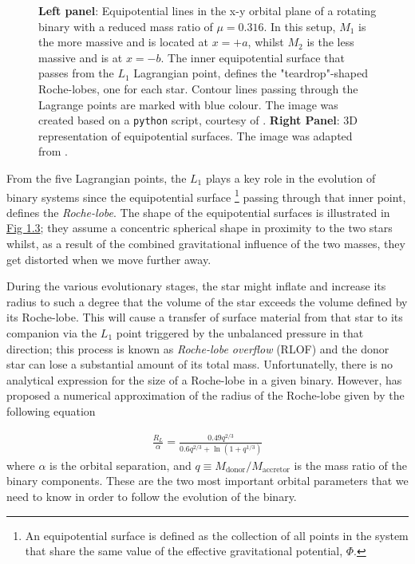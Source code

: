 \documentclass[../../main/thesis_msc.tex]{subfiles}
\begin{document}
\begin{figure}[h]
\begin{subfigure}[h]{0.535\textwidth}
   					 \end{subfigure}
   					 \caption{\textbf{Left panel}: Equipotential lines in the x-y orbital plane of a rotating binary with a reduced mass ratio of $\mu = 0.316$. In this setup, $M_1$ is the more massive and is located at $x = +a$, whilst $M_2$ is the less massive and is at $x = -b$. The inner equipotential surface that passes from the $L_1$ Lagrangian point, defines the "teardrop"-shaped Roche-lobes, one for each star. Contour lines passing through the Lagrange points are marked with blue colour. The image was created based on a \texttt{python} script, courtesy of \cite{Zingale}. \textbf{Right Panel}: 3D representation of equipotential surfaces. The image was adapted from \cite{Sluijs}.}
   					 \label{fig:eq_sur}
				\end{figure}
				
				From the five Lagrangian points, the $L_1$ plays a key role in the evolution of binary systems since the equipotential surface \footnote{An equipotential surface is defined as the collection of all points in the system that share the same value of the effective gravitational potential, $\Phi$.} passing through that inner point, defines the \emph{Roche-lobe}. The shape of the equipotential surfaces is illustrated in \hyperref[fig:eq_sur]{Fig 1.3}; they assume a concentric spherical shape in proximity to the two stars whilst, as a result of the combined gravitational influence of the two masses, they get distorted when we move further away.
				
				During the various evolutionary stages, the star might inflate and increase its radius to such a degree that the volume of the star exceeds the volume defined by its Roche-lobe. This will cause a transfer of surface material from that star to its companion via the $L_1$ point triggered by the unbalanced pressure in that direction; this process is known as \emph{Roche-lobe overflow} (RLOF) and the donor star can lose a substantial amount of its total mass. Unfortunatelly, there is no analytical expression for the size of a Roche-lobe in a given binary. However, \cite{Eggleton1983} has proposed a numerical approximation of the radius of the Roche-lobe given by the following equation
				
				\begin{eqnarray}
					\label{eq:rl_radius}
					\frac{R_L}{\alpha} = \frac{0.49 q^{2/3}}{0.6 q^{2/3} + \ln(1 + q^{1/3})}
				\end{eqnarray}				 
				where $\alpha$ is the orbital separation, and $q \equiv M_{\text{donor}} / M_{\text{accretor}}$ is the mass ratio of the binary components. These are the two most important orbital parameters that we need to know in order to follow the evolution of the binary.
				
\end{document}

